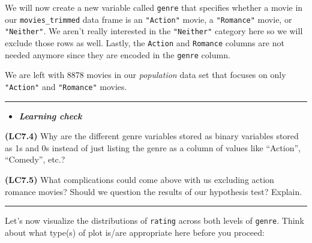 \documentclass[]{tufte-book}
\newenvironment{Shaded}{\begin{snugshade}}{\end{snugshade}}
\newcommand{\KeywordTok}[1]{\textcolor[rgb]{0.13,0.29,0.53}{\textbf{{#1}}}}
\newcommand{\DataTypeTok}[1]{\textcolor[rgb]{0.13,0.29,0.53}{{#1}}}
\newcommand{\DecValTok}[1]{\textcolor[rgb]{0.00,0.00,0.81}{{#1}}}
\newcommand{\StringTok}[1]{\textcolor[rgb]{0.31,0.60,0.02}{{#1}}}
\newcommand{\NormalTok}[1]{{#1}}
\newenvironment{rmdblock}[1]
  {\begin{shaded*}
  \begin{itemize}
  \renewcommand{\labelitemi}{
    \raisebox{-.7\height}[0pt][0pt]{
    }
  }
  \item
  }
  {
  \end{itemize}
  \end{shaded*}
  }
\newenvironment{learncheck}
  {\begin{rmdblock}{warning}}
  {\end{rmdblock}}
\begin{document}
We will now create a new variable called \texttt{genre} that specifies
whether a movie in our \texttt{movies\_trimmed} data frame is an
\texttt{"Action"} movie, a \texttt{"Romance"} movie, or
\texttt{"Neither"}. We aren't really interested in the
\texttt{"Neither"} category here so we will exclude those rows as well.
Lastly, the \texttt{Action} and \texttt{Romance} columns are not needed
anymore since they are encoded in the \texttt{genre} column.

\begin{Shaded}
\end{Shaded}

We are left with 8878 movies in our \emph{population} data set that
focuses on only \texttt{"Action"} and \texttt{"Romance"} movies.

\begin{center}\rule{\linewidth}{\linethickness}\end{center}\begin{learncheck}
\textbf{\emph{Learning check}}
\end{learncheck}

\textbf{(LC7.4)} Why are the different genre variables stored as binary
variables stored as 1s and 0s instead of just listing the genre as a
column of values like ``Action'', ``Comedy'', etc.?

\textbf{(LC7.5)} What complications could come above with us excluding
action romance movies? Should we question the results of our hypothesis
test? Explain.

\begin{center}\rule{\linewidth}{\linethickness}\end{center}

Let's now visualize the distributions of \texttt{rating} across both
levels of \texttt{genre}. Think about what type(s) of plot is/are
appropriate here before you proceed:
\end{document}
